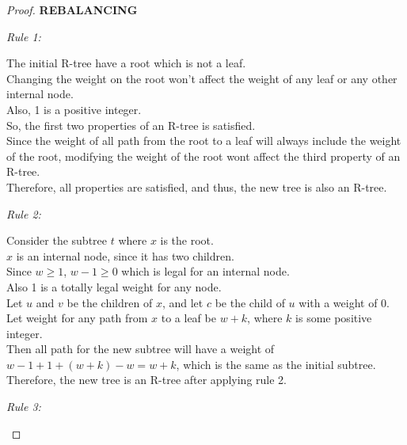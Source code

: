 \documentclass[10pt]{article}
\begin{document}
\begin{enumerate}
\begin{proof}
	\textbf{REBALANCING}
	\begin{addmargin}[1em]{0em}
		\textit{Rule 1:}
		\begin{addmargin}
			The initial R-tree have a root which is not a leaf. \\
			Changing the weight on the root won't affect the weight of any leaf
			or any other internal node. \\
			Also, 1 is a positive integer. \\
			So, the first two properties of an R-tree is satisfied. \\
			Since the weight of all path from the root to a leaf will always
			include the weight of the root, modifying the weight of the root
			wont affect the third property of an R-tree. \\
			Therefore, all properties are satisfied, and thus, the new tree is
			also an R-tree. \\
		\end{addmargin}
		\textit{Rule 2:}
		\begin{addmargin}
			Consider the subtree $t$ where $x$ is the root. \\
			$x$ is an internal node, since it has two children. \\
			Since $w \geq 1$, $w-1 \geq 0$ which is legal for an internal node.\\
			Also 1 is a totally legal weight for any node. \\
			Let $u$ and $v$ be the children of $x$, and let $c$ be the child of
			$u$ with a weight of 0. \\
			Let weight for any path from $x$ to a leaf be $w+k$, where $k$ is
			some positive integer. \\
			Then all path for the new subtree will have a weight of $w-1 + 1 +
			(w+k) - w = w+k$, which is the same as the initial subtree. \\
			Therefore, the new tree is an R-tree after applying rule 2.
		\end{addmargin}

		\textit{Rule 3:}

		\begin{addmargin}[1em]{0em}
		\end{addmargin}

		\begin{addmargin}[1em]{0em}
		\end{addmargin}

		\begin{addmargin}[1em]{0em}
		\end{addmargin}


\end{addmargin}
\end{proof}
\end{enumerate}
\end{document}
